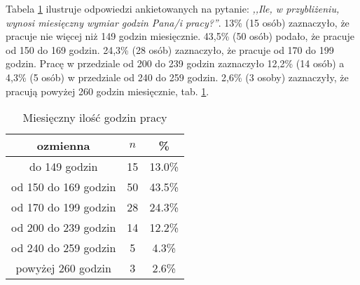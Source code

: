 Tabela \ref{tab:Q3} ilustruje odpowiedzi ankietowanych na pytanie: \textit{,,Ile, w przybliżeniu, wynosi miesięczny wymiar godzin Pana/i pracy?''}. 13\% (15 osób) zaznaczyło, że pracuje nie więcej niż 149 godzin miesięcznie. 43,5\%  (50 osób) podało, że pracuje od 150 do 169 godzin. 24,3\% (28 osób) zaznaczyło, że pracuje od 170 do 199 godzin. Pracę w przedziale od 200 do 239 godzin zaznaczyło 12,2\% (14 osób) a 4,3\% (5 osób) w przedziale od 240 do 259 godzin. 2,6\% (3 osoby) zaznaczyły, że pracują powyżej 260 godzin miesięcznie, tab. \ref{tab:Q3}.

 
\begin{table}[H]
\caption{Miesięczny ilość godzin pracy}
\centering
\begin{tabular}{ | c | c | c |}
\hline
ozmienna & $n$ & \% \\
\hline
do 149 godzin  &  15  & 13.0\% \\
\hline
od 150 do 169 godzin  &  50  & 43.5\% \\
\hline
od 170 do 199 godzin  &  28  & 24.3\% \\
\hline
od 200 do 239 godzin  &  14  & 12.2\% \\
\hline
od 240 do 259 godzin  &  5  & 4.3\% \\
\hline
powyżej 260 godzin  &  3  & 2.6\% \\
\hline
\end{tabular}
\label{tab:Q3}
\end{table}

